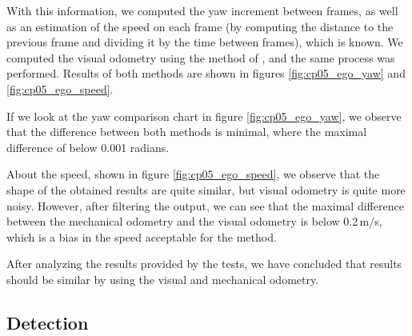 With this information, we computed the yaw increment between frames, as well as an estimation of the speed on each frame (by computing the distance to the previous frame and dividing it by the time between frames), which is known. We computed the visual odometry using the method of \cite{geiger2011stereoscan}, and the same process was performed. Results of both methods are shown in figures \ref{fig:cp05_ego_yaw} and \ref{fig:cp05_ego_speed}.

If we look at the yaw comparison chart in figure \ref{fig:cp05_ego_yaw}, we observe that the difference between both methods is minimal, where the maximal difference of below 0.001 radians.

About the speed, shown in figure \ref{fig:cp05_ego_speed}, we observe that the shape of the obtained results are quite similar, but visual odometry is quite more noisy. However, after filtering the output, we can see that the maximal difference between the mechanical odometry and the visual odometry is below 0.2\,m/s, which is a bias in the speed acceptable for the method.

After analyzing the results provided by the tests, we have concluded that results should be similar by using the visual and mechanical odometry.

\subsection{Detection}\label{ch:chapter05_02_03}

